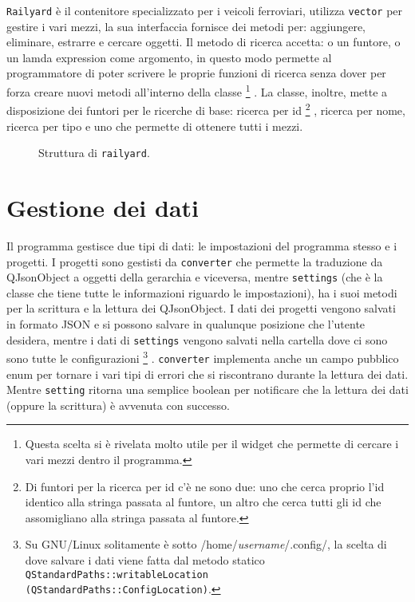 \documentclass[a4paper,10pt]{article}
\begin{document}
\texttt{Railyard} è il contenitore specializzato per i veicoli ferroviari, utilizza \texttt{vector} per gestire i vari mezzi, la sua interfaccia fornisce dei metodi per: aggiungere, eliminare, estrarre e cercare oggetti. Il metodo di ricerca accetta: o un funtore, o un lamda expression come argomento, in questo modo permette al programmatore di poter scrivere le proprie funzioni di ricerca senza dover per forza creare nuovi metodi all'interno della classe%
\footnote{Questa scelta si è rivelata molto utile per il widget che permette di cercare i vari mezzi dentro il programma.}%
. La classe, inoltre, mette a disposizione dei funtori per le ricerche di base: ricerca per id%
\footnote{Di funtori per la ricerca per id c'è ne sono due: uno che cerca proprio l'id identico alla stringa passata al funtore, un altro che cerca tutti gli id che assomigliano alla stringa passata al funtore.}%
, ricerca per nome, ricerca per tipo e uno che permette di ottenere tutti i mezzi. 
\begin{figure}[htp]

\caption{Struttura di \texttt{railyard}.}
\end{figure}

\section {Gestione dei dati}
\label{sec:gestione-dati}
Il programma gestisce due tipi di dati: le impostazioni del programma stesso e i progetti. I progetti sono gestisti da \texttt{converter} che permette la traduzione da QJsonObject a oggetti della gerarchia e viceversa, mentre \texttt{settings} (che è la classe che tiene tutte le informazioni riguardo le impostazioni), ha i suoi metodi per la scrittura e la lettura dei QJsonObject. I dati dei progetti vengono salvati in formato JSON e si possono salvare in qualunque posizione che l'utente desidera, mentre i dati di \texttt{settings} vengono salvati nella cartella dove ci sono sono tutte le configurazioni%
\footnote{Su GNU/Linux solitamente è sotto /home/\emph{username}/.config/, la scelta di dove salvare i dati viene fatta dal metodo statico \texttt{QStandardPaths::writableLocation (QStandardPaths::ConfigLocation)}.}%
.
\texttt{converter} implementa anche un campo pubblico enum per tornare i vari tipi di errori che si riscontrano durante la lettura dei dati. Mentre \texttt{setting} ritorna una semplice boolean per notificare che la lettura dei dati (oppure la scrittura) è avvenuta con successo.
\end{document}

